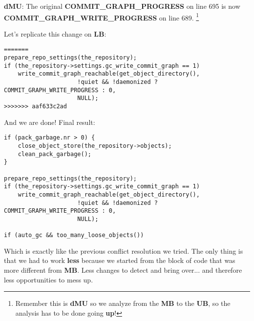 {\bf dMU}: The original {\bf COMMIT\_GRAPH\_PROGRESS} on line 695 is now {\bf COMMIT\_GRAPH\_WRITE\_PROGRESS} on line 689.
\footnote{Remember this is {\bf dMU} so we analyze from the {\bf MB} to the {\bf UB}, so the analysis has to be done
going {\bf up}!}

Let's replicate this change on {\bf LB}:

\begin{lstlisting}[style=c_style,
	basicstyle=\tiny,
	firstnumber=698,
	caption={\bf example 5} - Step 1]
=======
prepare_repo_settings(the_repository);
if (the_repository->settings.gc_write_commit_graph == 1)
	write_commit_graph_reachable(get_object_directory(),
				     !quiet && !daemonized ? COMMIT_GRAPH_WRITE_PROGRESS : 0,
				     NULL);
>>>>>>> aaf633c2ad
\end{lstlisting}

And we are done! Final result:
\begin{lstlisting}[style=c_style,
	basicstyle=\tiny,
	firstnumber=681,
	caption={\bf example 5} - final result]
if (pack_garbage.nr > 0) {
	close_object_store(the_repository->objects);
	clean_pack_garbage();
}

prepare_repo_settings(the_repository);
if (the_repository->settings.gc_write_commit_graph == 1)
	write_commit_graph_reachable(get_object_directory(),
				     !quiet && !daemonized ? COMMIT_GRAPH_WRITE_PROGRESS : 0,
				     NULL);

if (auto_gc && too_many_loose_objects())
\end{lstlisting}

Which is exactly like the previous conflict resolution we tried. The only thing is that we had to work {\bf less} because
we started from the block of code that was more different from {\bf MB}. Less changes to detect and bring
over... and therefore less opportunities to mess up.

